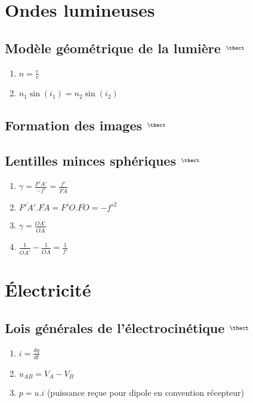 \documentclass[fleqn]{article}
\theoremstyle{definition} \newtheorem*{defi}{D\'efinition}
\theoremstyle{definition} \newtheorem*{theo}{Th\'eor\`eme}
\theoremstyle{definition} \newtheorem*{coro}{Corollaire}
\theoremstyle{remark} \newtheorem*{rqs}{Remarques}
\theoremstyle{definition} \newtheorem*{prop}{Propri\'et\'e}
\begin{document}
\section{Ondes lumineuses}
\subsection{Mod\`ele g\'eom\'etrique de la lumi\`ere $^\thect$}
\begin{enumerate}
	\item $n = \frac{c}{v}$
	\item $n_1 \sin(i_1) = n_2 \sin(i_2)$
\end{enumerate}

\subsection{Formation des images $^\thect$}

\subsection{Lentilles minces sph\'eriques $^\thect$}
\begin{enumerate}
	\item $\gamma = \frac{\overline{F'A'}}{-f'} = \frac{f'}{\overline{FA}}$
	\item $\overline{F'A'}.\overline{FA} = \overline{F'O}.\overline{FO} = -f'^2$
	\item $\gamma = \frac{\overline{OA'}}{\overline{OA}}$
	\item $\frac{1}{\overline{OA'}} - \frac{1}{\overline{OA}} = \frac{1}{f'}$
\end{enumerate}

\section{\'Electricit\'e}
\subsection{Lois g\'en\'erales de l'\'electrocin\'etique $^\thect$}
\begin{enumerate}
	\item $i = \frac{dq}{dt}$
	\item $u_{AB} = V_A - V_B$
	\item $p = u.i$ (puissance re\c{c}ue pour dipole en convention r\'ecepteur)
\end{enumerate}
\end{document}
